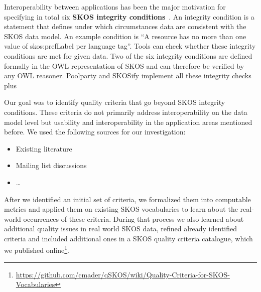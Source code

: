
Interoperability between applications has been the major motivation for specifying in total six \textbf{SKOS integrity conditions}~\cite{Miles2005}. An integrity condition is a statement that defines under which circumstances data are consistent with the SKOS data model. An example condition is ``A resource has no more than one value of skos:prefLabel per language tag''. Tools can check whether these integrity conditions are met for given data. Two of the six integrity conditions are defined formally in the OWL representation of SKOS and can therefore be verified by any OWL reasoner. Poolparty and SKOSify implement all these integrity checks plus 




Our goal was to identify quality criteria that go beyond SKOS integrity conditions. These criteria do not primarily address interoperability on the data model level but usability and interoperability in the application areas mentioned before. We used the following sources for our investigation:

\begin{itemize}
    \item Existing literature
    \item Mailing list discussions
    \item \ldots {}
\end{itemize}

After we identified an initial set of criteria, we formalized them into computable metrics and applied them on existing SKOS vocabularies to learn about the real-world occurrences of these criteria. During that process we also learned about additional quality issues in real world SKOS data, refined already identified criteria and included additional ones in a SKOS quality criteria catalogue, which we published online\footnote{\url{https://github.com/cmader/qSKOS/wiki/Quality-Criteria-for-SKOS-Vocabularies}}.

